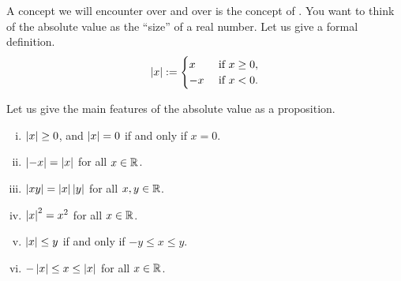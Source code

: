 
A concept we will encounter over and over is the concept of
\emph{}.
You want to think of the absolute value as the ``size'' of a real number.
Let us give a formal definition.
\begin{equation*}
\left\lvert {x} \right\rvert :=
\begin{cases}
x & \text{ if $x \geq 0$}, \\
-x & \text{ if $x < 0$} .
\end{cases}
\end{equation*}

Let us give the main features of the absolute
value as a proposition.

\begin{prop} \label{prop:absbas}
\leavevmode
\begin{enumerate}[(i)]
\item \label{prop:absbas:i} $\left\lvert {x} \right\rvert \geq 0$, and $\left\lvert {x} \right\rvert=0$ if and only if $x = 0$.
\item \label{prop:absbas:ii} $\left\lvert {-x} \right\rvert = \left\lvert {x} \right\rvert$ for all $x \in {\mathbb{R}}$.
\item \label{prop:absbas:iii} $\left\lvert {xy} \right\rvert = \left\lvert {x} \right\rvert\left\lvert {y} \right\rvert$ for all $x,y \in {\mathbb{R}}$.
\item \label{prop:absbas:iv} $\left\lvert {x} \right\rvert^2 = x^2$ for all $x \in {\mathbb{R}}$.
\item \label{prop:absbas:v} $\left\lvert {x} \right\rvert \leq y$ if and only if $-y \leq x \leq y$.
\item \label{prop:absbas:vi} $-\left\lvert {x} \right\rvert \leq x \leq \left\lvert {x} \right\rvert$ for all $x \in {\mathbb{R}}$.
\end{enumerate}
\end{prop}

